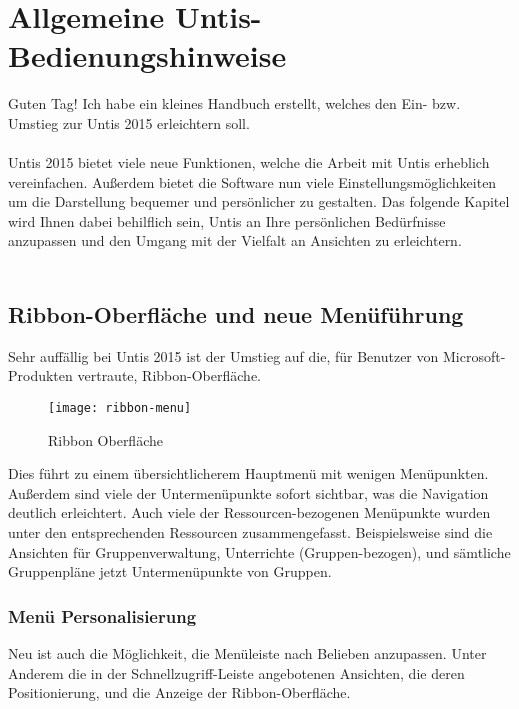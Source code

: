 
\chapter{Allgemeine Untis-Bedienungshinweise}

Guten Tag! Ich habe ein kleines Handbuch erstellt, welches den Ein- bzw. Umstieg zur Untis 2015 erleichtern soll.\\
\\
Untis 2015 bietet viele neue Funktionen, welche die Arbeit mit Untis erheblich vereinfachen. Außerdem bietet die Software nun viele Einstellungsmöglichkeiten um die Darstellung bequemer und persönlicher zu gestalten. Das folgende Kapitel wird Ihnen dabei behilflich sein, Untis an Ihre persönlichen Bedürfnisse anzupassen und den Umgang mit der Vielfalt an Ansichten zu erleichtern.\\
\\

\section{Ribbon-Oberfläche und neue Menüführung}

Sehr auffällig bei Untis 2015 ist der Umstieg auf die, für Benutzer von Microsoft-Produkten vertraute, Ribbon-Oberfläche. 

\begin{figure}[h]
	\texttt{[image: ribbon-menu]}
	\vspace{-15pt}
	\caption{Ribbon Oberfläche}
	\label{fig:ribbon}
\end{figure}

\noindent
Dies führt zu einem übersichtlicherem Hauptmenü mit wenigen Menüpunkten. Außerdem sind viele der Untermenüpunkte sofort sichtbar, was die Navigation deutlich erleichtert. Auch viele der Ressourcen-bezogenen Menüpunkte wurden unter den entsprechenden Ressourcen zusammengefasst. Beispielsweise sind die Ansichten für Gruppenverwaltung, Unterrichte (Gruppen-bezogen), und sämtliche Gruppenpläne jetzt Untermenüpunkte von Gruppen.  

\subsection{Menü Personalisierung}

Neu ist auch die Möglichkeit, die Menüleiste nach Belieben anzupassen. Unter Anderem die in der Schnellzugriff-Leiste angebotenen Ansichten, die deren Positionierung, und die Anzeige der Ribbon-Oberfläche.\\

